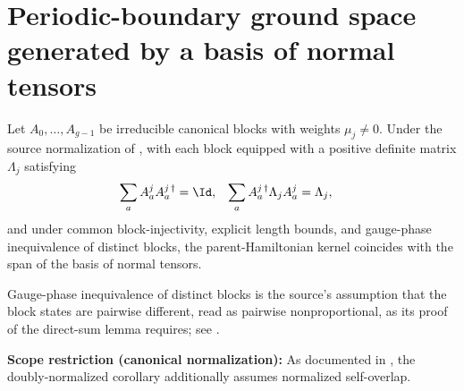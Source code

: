 \section{Periodic-boundary ground space generated by a basis of normal tensors}
\label{sec:bnt_span_consequences}

Let $A_0,\ldots,A_{g-1}$ be irreducible canonical blocks with weights $\mu_j \ne 0$.
Under the source normalization of \cite[Theorem~12]{PerezGarcia2007Matrix},
with each block equipped with a positive definite matrix $\Lambda_j$ satisfying
\begin{align}
    \sum_a A^j_a A^{j\,\dagger}_a          & =\Id,
                                           &
    \sum_a A^{j\,\dagger}_a\Lambda_j A^j_a & =\Lambda_j,
    \notag
\end{align}
and under common block-injectivity, explicit length bounds, and gauge-phase
inequivalence of distinct blocks, the parent-Hamiltonian kernel coincides with
the span of the basis of normal tensors.

Gauge-phase inequivalence of distinct blocks is the source's assumption that
the block states are pairwise different, read as pairwise nonproportional, as
its proof of the direct-sum lemma requires; see
\cite{gap:pgvwc07_direct_sum_input}.

\textbf{Scope restriction (canonical normalization):} As documented in
\cite{gap:pgvwc07_ti_canonical_form_scope}, the doubly-normalized corollary
additionally assumes normalized self-overlap.

